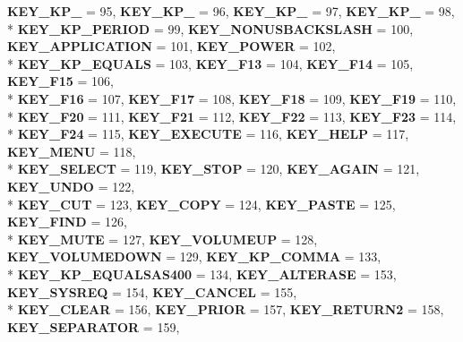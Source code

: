 \begin{DoxyCompactItemize}
{\bfseries K\+E\+Y\+\_\+\+K\+P\+\_} = 95, 
{\bfseries K\+E\+Y\+\_\+\+K\+P\+\_} = 96, 
{\bfseries K\+E\+Y\+\_\+\+K\+P\+\_} = 97, 
{\bfseries K\+E\+Y\+\_\+\+K\+P\+\_} = 98, 
\\*
{\bfseries K\+E\+Y\+\_\+\+K\+P\+\_\+\+P\+E\+R\+I\+O\+D} = 99, 
{\bfseries K\+E\+Y\+\_\+\+N\+O\+N\+U\+S\+B\+A\+C\+K\+S\+L\+A\+S\+H} = 100, 
{\bfseries K\+E\+Y\+\_\+\+A\+P\+P\+L\+I\+C\+A\+T\+I\+O\+N} = 101, 
{\bfseries K\+E\+Y\+\_\+\+P\+O\+W\+E\+R} = 102, 
\\*
{\bfseries K\+E\+Y\+\_\+\+K\+P\+\_\+\+E\+Q\+U\+A\+L\+S} = 103, 
{\bfseries K\+E\+Y\+\_\+\+F13} = 104, 
{\bfseries K\+E\+Y\+\_\+\+F14} = 105, 
{\bfseries K\+E\+Y\+\_\+\+F15} = 106, 
\\*
{\bfseries K\+E\+Y\+\_\+\+F16} = 107, 
{\bfseries K\+E\+Y\+\_\+\+F17} = 108, 
{\bfseries K\+E\+Y\+\_\+\+F18} = 109, 
{\bfseries K\+E\+Y\+\_\+\+F19} = 110, 
\\*
{\bfseries K\+E\+Y\+\_\+\+F20} = 111, 
{\bfseries K\+E\+Y\+\_\+\+F21} = 112, 
{\bfseries K\+E\+Y\+\_\+\+F22} = 113, 
{\bfseries K\+E\+Y\+\_\+\+F23} = 114, 
\\*
{\bfseries K\+E\+Y\+\_\+\+F24} = 115, 
{\bfseries K\+E\+Y\+\_\+\+E\+X\+E\+C\+U\+T\+E} = 116, 
{\bfseries K\+E\+Y\+\_\+\+H\+E\+L\+P} = 117, 
{\bfseries K\+E\+Y\+\_\+\+M\+E\+N\+U} = 118, 
\\*
{\bfseries K\+E\+Y\+\_\+\+S\+E\+L\+E\+C\+T} = 119, 
{\bfseries K\+E\+Y\+\_\+\+S\+T\+O\+P} = 120, 
{\bfseries K\+E\+Y\+\_\+\+A\+G\+A\+I\+N} = 121, 
{\bfseries K\+E\+Y\+\_\+\+U\+N\+D\+O} = 122, 
\\*
{\bfseries K\+E\+Y\+\_\+\+C\+U\+T} = 123, 
{\bfseries K\+E\+Y\+\_\+\+C\+O\+P\+Y} = 124, 
{\bfseries K\+E\+Y\+\_\+\+P\+A\+S\+T\+E} = 125, 
{\bfseries K\+E\+Y\+\_\+\+F\+I\+N\+D} = 126, 
\\*
{\bfseries K\+E\+Y\+\_\+\+M\+U\+T\+E} = 127, 
{\bfseries K\+E\+Y\+\_\+\+V\+O\+L\+U\+M\+E\+U\+P} = 128, 
{\bfseries K\+E\+Y\+\_\+\+V\+O\+L\+U\+M\+E\+D\+O\+W\+N} = 129, 
{\bfseries K\+E\+Y\+\_\+\+K\+P\+\_\+\+C\+O\+M\+M\+A} = 133, 
\\*
{\bfseries K\+E\+Y\+\_\+\+K\+P\+\_\+\+E\+Q\+U\+A\+L\+S\+A\+S400} = 134, 
{\bfseries K\+E\+Y\+\_\+\+A\+L\+T\+E\+R\+A\+S\+E} = 153, 
{\bfseries K\+E\+Y\+\_\+\+S\+Y\+S\+R\+E\+Q} = 154, 
{\bfseries K\+E\+Y\+\_\+\+C\+A\+N\+C\+E\+L} = 155, 
\\*
{\bfseries K\+E\+Y\+\_\+\+C\+L\+E\+A\+R} = 156, 
{\bfseries K\+E\+Y\+\_\+\+P\+R\+I\+O\+R} = 157, 
{\bfseries K\+E\+Y\+\_\+\+R\+E\+T\+U\+R\+N2} = 158, 
{\bfseries K\+E\+Y\+\_\+\+S\+E\+P\+A\+R\+A\+T\+O\+R} = 159, 

\end{DoxyCompactItemize}
